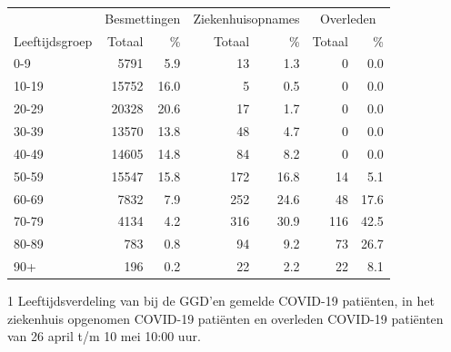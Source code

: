 \documentclass[
  english,
  man,floatsintext]{apa6}
\begin{document}
\begin{table}
\centering\begingroup\fontsize{11}{13}\selectfont

\begin{threeparttable}
\begin{tabular}{lrrrrrr}
\toprule
\multicolumn{1}{c}{ } & \multicolumn{2}{c}{Besmettingen} & \multicolumn{2}{c}{Ziekenhuisopnames} & \multicolumn{2}{c}{Overleden} \\
\cmidrule(l{3pt}r{3pt}){2-3} \cmidrule(l{3pt}r{3pt}){4-5} \cmidrule(l{3pt}r{3pt}){6-7}
Leeftijdsgroep & Totaal & \% & Totaal & \% & Totaal & \%\\
\midrule
0-9 & 5791 & 5.9 & 13 & 1.3 & 0 & 0.0\\
10-19 & 15752 & 16.0 & 5 & 0.5 & 0 & 0.0\\
20-29 & 20328 & 20.6 & 17 & 1.7 & 0 & 0.0\\
30-39 & 13570 & 13.8 & 48 & 4.7 & 0 & 0.0\\
40-49 & 14605 & 14.8 & 84 & 8.2 & 0 & 0.0\\
50-59 & 15547 & 15.8 & 172 & 16.8 & 14 & 5.1\\
60-69 & 7832 & 7.9 & 252 & 24.6 & 48 & 17.6\\
70-79 & 4134 & 4.2 & 316 & 30.9 & 116 & 42.5\\
80-89 & 783 & 0.8 & 94 & 9.2 & 73 & 26.7\\
90+ & 196 & 0.2 & 22 & 2.2 & 22 & 8.1\\
\bottomrule
\end{tabular}
\begin{tablenotes}
\item[1] Leeftijdsverdeling van bij de GGD’en gemelde COVID-19 patiënten, in het ziekenhuis opgenomen COVID-19 patiënten en overleden COVID-19 patiënten van 26 april t/m 10 mei 10:00 uur.
\end{tablenotes}
\end{threeparttable}
\endgroup{}
\end{table}

\newpage
\end{document}
